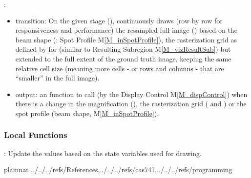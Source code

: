 \documentclass[12pt, titlepage]{article}
\newcommand{\mref}[1]{M\ref{#1}}
\begin{document}
\noindent {}:
\begin{itemize}
\item transition: On the given stage (), 
  continuously draws (row by row for responsiveness and performance)
  the resampled full image ()
  based on the beam shape (: Spot Profile \mref{M_inSpotProfile}),
  the rasterization grid as defined by  for 
  (similar to Resulting Subregion \mref{M_vizResultSub})
  but extended to the full extent of the ground truth image, keeping the same
  relative cell size (meaning more cells - or rows and columns - 
  that are ``smaller'' in the full image). 
\item output: an  function to call
  (by the Display Control \mref{M_dispControl}) when there is a change
  in the magnification (), the rasterization grid 
  ( and )
  or the spot profile (beam shape, \mref{M_inSpotProfile}).
\end{itemize}

\subsubsection{Local Functions}
: Update the values based on the state variables used for drawing.

\newpage





 {plainnat}
 {../../../refs/References,../../../refs/cas741,../../../refs/programming}

\newpage
\end{document}
